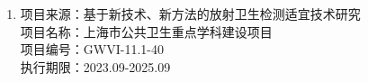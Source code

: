 \begin{projects}
        \begin{enumerate}
                \item
                      项目来源：基于新技术、新方法的放射卫生检测适宜技术研究 \\
                      项目名称：上海市公共卫生重点学科建设项目 \\
                      项目编号：GWVI-11.1-40 \\
                      执行期限：2023.09-2025.09
        \end{enumerate}
\end{projects}